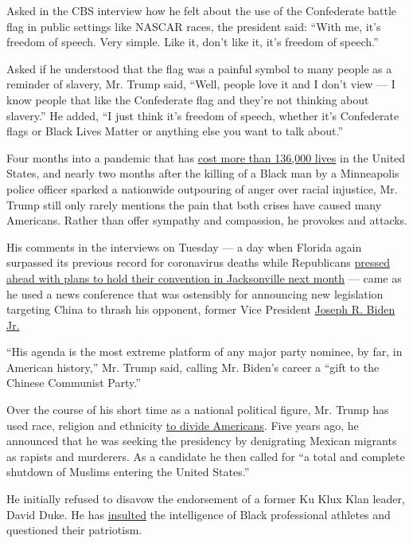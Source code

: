 Asked in the CBS interview how he felt about the use of the Confederate
battle flag in public settings like NASCAR races, the president said:
``With me, it's freedom of speech. Very simple. Like it, don't like it,
it's freedom of speech.''

Asked if he understood that the flag was a painful symbol to many people
as a reminder of slavery, Mr. Trump said, ``Well, people love it and I
don't view --- I know people that like the Confederate flag and they're
not thinking about slavery.'' He added, ``I just think it's freedom of
speech, whether it's Confederate flags or Black Lives Matter or anything
else you want to talk about.''

Four months into a pandemic that has
\href{https://www.nytimes3xbfgragh.onion/interactive/2020/us/coronavirus-us-cases.html}{cost
more than 136,000 lives} in the United States, and nearly two months
after the killing of a Black man by a Minneapolis police officer sparked
a nationwide outpouring of anger over racial injustice, Mr. Trump still
only rarely mentions the pain that both crises have caused many
Americans. Rather than offer sympathy and compassion, he provokes and
attacks.

His comments in the interviews on Tuesday --- a day when Florida again
surpassed its previous record for coronavirus deaths while Republicans
\href{https://www.nytimes3xbfgragh.onion/2020/07/13/us/politics/florida-virus-republican-convention.html}{pressed
ahead with plans to hold their convention in Jacksonville next month}
--- came as he used a news conference that was ostensibly for announcing
new legislation targeting China to thrash his opponent, former Vice
President
\href{https://www.nytimes3xbfgragh.onion/interactive/2020/us/elections/joe-biden.html}{Joseph
R. Biden Jr.}

``His agenda is the most extreme platform of any major party nominee, by
far, in American history,'' Mr. Trump said, calling Mr. Biden's career a
``gift to the Chinese Communist Party.''

Over the course of his short time as a national political figure, Mr.
Trump has used race, religion and ethnicity
\href{https://www.nytimes3xbfgragh.onion/2020/06/23/us/politics/trump-race-racism-protests.html}{to
divide Americans}. Five years ago, he announced that he was seeking the
presidency by denigrating Mexican migrants as rapists and murderers. As
a candidate he then called for ``a total and complete shutdown of
Muslims entering the United States.''

He initially refused to disavow the endorsement of a former Ku Klux Klan
leader, David Duke. He has
\href{https://www.nytimes3xbfgragh.onion/2018/08/04/sports/donald-trump-lebron-james-twitter.html}{insulted}
the intelligence of Black professional athletes and questioned their
patriotism.

